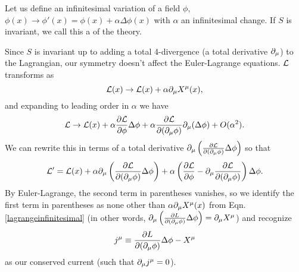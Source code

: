 Let us define an infinitesimal variation of a field $\phi$,
$\phi(x)\to \phi'(x)=\phi(x)+\alpha \Delta \phi(x)$
with $\alpha$ an infinitesimal change. If $S$ is invariant, we call this a  of the theory.

Since $S$ is invariant up to adding a total 4-divergence (a total derivative $\partial_\mu$) to the Lagrangian, our symmetry doesn't affect the Euler-Lagrange equations. $\mathcal L$ transforms as
\begin{equation}\label{lagrangeinfinitesimal}
    \mathcal L(x)\to \mathcal L(x)+\alpha \partial_\mu X^\mu(x),
\end{equation}
and expanding to leading order in $\alpha$ we have
\begin{equation}
    \mathcal L\to \mathcal L(x)+\alpha \frac{\partial \mathcal L}{\partial \phi}\Delta \phi +\alpha \frac{\partial \mathcal L}{\partial (\partial_\mu\phi)}\partial_\mu(\Delta\phi)+O(\alpha^2).
\end{equation}
We can rewrite this in terms of a total derivative $\partial_\mu\left(\frac{\partial \mathcal L}{\partial (\partial_\mu\phi)}\Delta \phi\right)$
so that
\begin{equation}
\mathcal L'=\mathcal L(x)+\alpha \partial_\mu\left(\frac{\partial \mathcal L}{\partial (\partial_\mu\phi)}\Delta \phi\right) +\alpha \left(\frac{\partial \mathcal L}{\partial \phi}-\partial_\mu \frac{\partial \mathcal L}{\partial (\partial_\mu\phi)}\right)\Delta \phi.
\end{equation}
By Euler-Lagrange, the second term in parentheses vanishes, so we identify the first term in parentheses as none other than $\alpha \partial_\mu X^\mu(x)$ from Eqn. \ref{lagrangeinfinitesimal} (in other words, $\partial_\mu\left(\frac{\partial L}{\partial (\partial_\mu\phi)}\Delta \phi\right) =\partial_\mu X^\mu$) and recognize 
\begin{equation}
j^\mu\equiv\frac{\partial L}{\partial (\partial_\mu \phi)}\Delta \phi -X^\mu
\end{equation} as our conserved current (such that $\partial_\mu j^\mu =0$).

